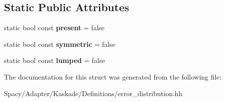 \subsection*{Static Public Attributes}
\begin{DoxyCompactItemize}
\item 
\hypertarget{structSpacy_1_1Kaskade_1_1ErrorDistribution_1_1D2_a527d46a4da6e1ddf997e2d91837cd0b3}{}static bool const {\bfseries present} = false\label{structSpacy_1_1Kaskade_1_1ErrorDistribution_1_1D2_a527d46a4da6e1ddf997e2d91837cd0b3}

\item 
\hypertarget{structSpacy_1_1Kaskade_1_1ErrorDistribution_1_1D2_af11aed2f092b490a062402d1966f4f8f}{}static bool const {\bfseries symmetric} = false\label{structSpacy_1_1Kaskade_1_1ErrorDistribution_1_1D2_af11aed2f092b490a062402d1966f4f8f}

\item 
\hypertarget{structSpacy_1_1Kaskade_1_1ErrorDistribution_1_1D2_af140ebc24432aef6ad4aabccfe0b359d}{}static bool const {\bfseries lumped} = false\label{structSpacy_1_1Kaskade_1_1ErrorDistribution_1_1D2_af140ebc24432aef6ad4aabccfe0b359d}

\end{DoxyCompactItemize}


The documentation for this struct was generated from the following file\+:\begin{DoxyCompactItemize}
\item 
Spacy/\+Adapter/\+Kaskade/\+Definitions/error\+\_\+distribution.\+hh\end{DoxyCompactItemize}
